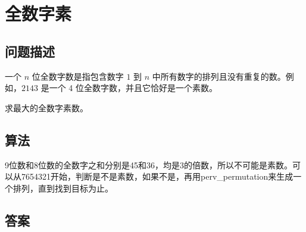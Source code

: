 \section{全数字素}
\subsection{问题描述}
\begin{tcolorbox}
一个 $n$ 位全数字数是指包含数字 $1$ 到 $n$ 中所有数字的排列且没有重复的数。例如，$2143$ 是一个 4 位全数字数，并且它恰好是一个素数。

求最大的全数字素数。
\end{tcolorbox}

\subsection{算法}
9位数和8位数的全数字之和分别是45和36，均是3的倍数，所以不可能是素数。可以从7654321开始，判断是不是素数，如果不是，再用perv\_permutation来生成一个排列，直到找到目标为止。

\subsection{答案}
